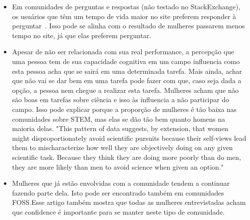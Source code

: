 \begin{itemize}
	\item Em comunidades de perguntas e respostas (não testado no StackExchange), os usuários que têm um tempo de vida maior no site preferem responder à perguntar~\cite{yang2010activity}. Isso pode se alinha com o resultado de mulheres passarem menos tempo no site, já que elas preferem perguntar.
	\item Apesar de não ser relacionada com sua real performance, a percepção que uma pessoa tem de sua capacidade cognitiva em um campo influencia como esta pessoa acha que se sairá em uma determinada tarefa. Mais ainda, achar que não vai se dar bem em uma tarefa pode fazer com que, caso seja dada a opção, a pessoa nem chegue a realizar esta tarefa. Mulheres acham que não são boas em tarefas sobre ciência e isso às influencia a não participar do campo.\cite{ehrlinger2003chronic} Isso pode explicar porque a proporção de mulheres é tão baixa nas comunidades sobre STEM, mas elas se dão tão bem quanto homens na maioria delas. "This pattern of data suggests, by extension, that women might disproportionately avoid scientific pursuits because their self-views lead them to mischaracterize how well they are objectively doing on any given scientific task. Because they think they are doing more poorly than do men, they are more likely than men to avoid science when given an option."
	\item Mulheres que já estão envolvidas com a comunidade tendem a continuar fazendo parte dela. Isto pode ser encontrado também em comunidades FOSS\cite{powell2010gender}.Esse artigo também mostra que todas as mulheres entrevistadas acham que confidence é importante para se manter neste tipo de comunidade.
\end{itemize}


